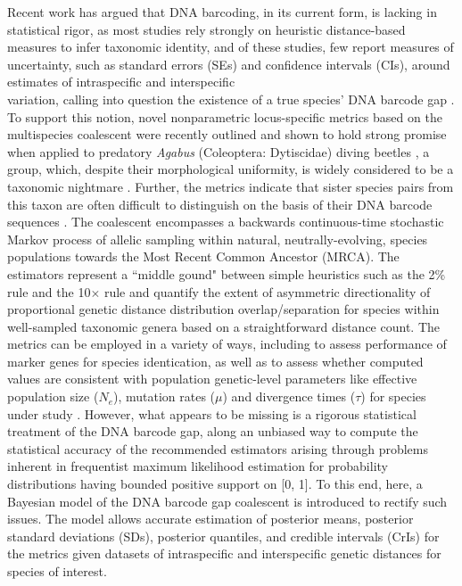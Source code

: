 \documentclass[12pt]{article}
\begin{document}
Recent work has argued that DNA barcoding, in its current form, is lacking in statistical rigor, as most studies rely strongly on heuristic distance-based measures to infer taxonomic identity, and of these studies, few report measures of uncertainty, such as standard errors (SEs) and confidence intervals (CIs), around estimates of intraspecific and interspecific \\ variation, calling into question the existence of a true species' DNA barcode gap \citep{phillips2022lack}. To support this notion, novel nonparametric locus-specific metrics based on the multispecies coalescent \citep{rannala2003bayes, yang2017bayesian} were recently outlined and shown to hold strong promise when applied to predatory \textit{Agabus} (Coleoptera: Dytiscidae) diving beetles \citep{phillips2024measure}, a group, which, despite their morphological uniformity, is widely considered to be a taxonomic nightmare \citep{bergsten2012effect}. Further, the metrics indicate that sister species pairs from this taxon are often difficult to distinguish on the basis of their DNA barcode sequences \citep{phillips2024measure}. The coalescent \citep{kingman1982coalescent} encompasses a backwards continuous-time stochastic Markov process of allelic sampling within natural, neutrally-evolving, species populations towards the Most Recent Common Ancestor (MRCA). The estimators represent a ``middle gound" between simple heuristics such as the 2\% rule \citep{hebert2003biological} and the 10$\times$ rule \citep{hebert2004identification} and quantify the extent of asymmetric directionality of proportional genetic distance distribution overlap/separation for species within well-sampled taxonomic genera based on a straightforward distance count. The metrics can be employed in a variety of ways, including to assess performance of marker genes for species identication, as well as to assess whether computed values are consistent with population genetic-level parameters like effective population size ($N_e$), mutation rates ($\mu$) and divergence times ($\tau$) for species under study \citep{mather2019practical}. However, what appears to be missing is a rigorous statistical treatment of the DNA barcode gap, along an unbiased way to compute the statistical accuracy of the recommended estimators arising through problems inherent in frequentist maximum likelihood estimation for probability distributions having bounded positive support on [0, 1]. To this end, here, a Bayesian model of the DNA barcode gap coalescent is introduced to rectify such issues. The model allows accurate estimation of posterior means, posterior standard deviations (SDs), posterior quantiles, and credible intervals (CrIs) for the metrics given datasets of intraspecific and interspecific genetic distances for species of interest.
\end{document}
